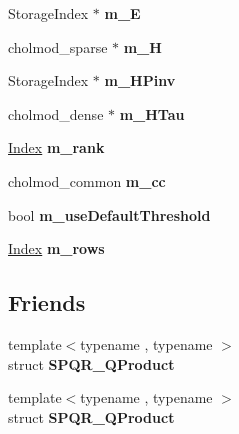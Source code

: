 \begin{DoxyCompactItemize}
Storage\+Index $\ast$ {\bfseries m\+\_\+E}
\item 
\mbox{\label{class_eigen_1_1_s_p_q_r_a57d3e6b770599f79e633640d350e97a4}} 
cholmod\+\_\+sparse $\ast$ {\bfseries m\+\_\+H}
\item 
\mbox{\label{class_eigen_1_1_s_p_q_r_aee3a9c9773e4de2134e9cc98edf0ee54}} 
Storage\+Index $\ast$ {\bfseries m\+\_\+\+H\+Pinv}
\item 
\mbox{\label{class_eigen_1_1_s_p_q_r_a1cf5a8eafddf38dee8ccbb36ee1d6765}} 
cholmod\+\_\+dense $\ast$ {\bfseries m\+\_\+\+H\+Tau}
\item 
\mbox{\label{class_eigen_1_1_s_p_q_r_a409e15f8004d93f7894583f73eada675}} 
\hyperlink{namespace_eigen_a62e77e0933482dafde8fe197d9a2cfde}{Index} {\bfseries m\+\_\+rank}
\item 
\mbox{\label{class_eigen_1_1_s_p_q_r_a29ab6683b538ca30772205ac0333e25f}} 
cholmod\+\_\+common {\bfseries m\+\_\+cc}
\item 
\mbox{\label{class_eigen_1_1_s_p_q_r_a4f6a5ff105e5a93593a62a6563d17682}} 
bool {\bfseries m\+\_\+use\+Default\+Threshold}
\item 
\mbox{\label{class_eigen_1_1_s_p_q_r_a7f9cc5503fc6bf6062c244ae618a4b12}} 
\hyperlink{namespace_eigen_a62e77e0933482dafde8fe197d9a2cfde}{Index} {\bfseries m\+\_\+rows}
\end{DoxyCompactItemize}
\subsection*{Friends}
\begin{DoxyCompactItemize}
\item 
\mbox{\label{class_eigen_1_1_s_p_q_r_a62e1c57e79306951013fc9d5b12c30e0}} 
{\footnotesize template$<$typename , typename $>$ }\\struct {\bfseries S\+P\+Q\+R\+\_\+\+Q\+Product}
\item 
\mbox{\label{class_eigen_1_1_s_p_q_r_a99c77fd70f132789dab362a107c5a3c0}} 
{\footnotesize template$<$typename , typename $>$ }\\struct {\bfseries S\+P\+Q\+R\+\_\+\+Q\+Product}
\end{DoxyCompactItemize}


